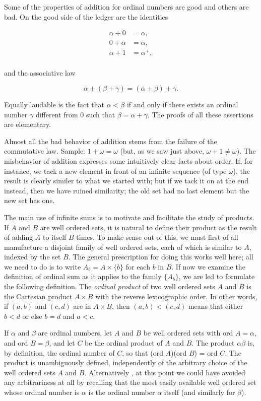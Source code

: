 Some of the properties of addition for ordinal numbers are good and others are bad. On the good side of the ledger are the identities 

\begin{align*}
\alpha + 0 &= \alpha , \\
0 + \alpha &= \alpha , \\
\alpha + 1 &= \alpha^{+} ,\\
\end{align*}

and the associative law 

\begin{equation*}
\alpha + (\beta + \gamma) = (\alpha + \beta) + \gamma .
\end{equation*}

Equally laudable is the fact that $\alpha < \beta$ if and only if there exists an ordinal number $\gamma$ different from $0$ such that $\beta =  \alpha + \gamma$. The proofs of all these assertions are elementary. 

Almost all the bad behavior of addition stems from the failure of the commutative law. Sample: $1 + \omega = \omega$ (but, as we saw just above, $\omega + 1 \neq \omega$). The misbehavior of addition expresses some intuitively clear facts about order. If, for instance, we tack a new element in front of an infinite sequence (of type $\omega$), the result is clearly similer to what we started with; but if we tack it on at the end instead, then we have ruined similarity; the old set had no last element but the new set has one. 

The main use of infinite sums is to motivate and facilitate the study of products. If $A$ and $B$ are well ordered sets, it is natural to define their product as the result of adding $A$ to itself $B$ times. To make sense out of this, we must first of all manufacture a disjoint family of well ordered sets, each of which is similar to $A$, indexed by the set $B$. The general prescription for doing this works well here; all we need to do is to write $A_{b} = A \times \{  b \}$ for each $b$ in $B$. If now we examine the definition of ordinal sum as it applies to the family $\{ A_{b} \}$, we are led to formulate the following definition. The \textit{ordinal product} of two well ordered sets $A$ and $B$ is the Cartesian product $A \times B$ with the reverse lexicographic order. In other words, if $(a,b)$ and $(c, d)$ are in $A \times B$, then $(a, b) < (c, d)$ means that either $b < d$ or else $b = d$ and $a < c$. 

If $\alpha$ and $\beta$ are ordinal numbers, let $A$ and $B$ be well ordered sets with ord $A = \alpha$, and ord $B = \beta$, and let $C$ be the ordinal product of $A$ and $B$. The product $\alpha \beta$ is, by definition, the ordinal number of $C$, so that (ord $A$)(ord $B$) = ord $C$. The product is unambiguously  defined, independently of the arbitrary choice of the well ordered sets $A$ and $B$. Alternatively , at this point we could have avoided any arbitrariness at all by recalling that the most easily available well ordered set whose  ordinal number is $\alpha$ is the ordinal number $\alpha$ itself (and similarly for $\beta$). 

